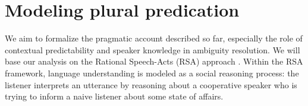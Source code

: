 \documentclass[preprint,12pt,authoryear,titlepage]{elsarticle}
\newcommand{\ndg}[1]{\textcolor{Green}{[ndg: #1]}}
\newcommand{\sem}[1]{\mbox{$[\![$#1$]\!]$}}
\begin{document}
\section{Modeling plural predication}
\label{model}


We aim to formalize the pragmatic account described so far, especially the role of contextual predictability and speaker knowledge in ambiguity resolution.
We will base our analysis on the Rational Speech-Acts (RSA) approach \citep{frankgoodman2012,goodmanstuhlmuller2013}. Within the RSA framework, language understanding is modeled as a social reasoning process: the listener interprets an utterance by reasoning about a cooperative speaker who is trying to inform a naive listener about some state of affairs. 

\end{document}
